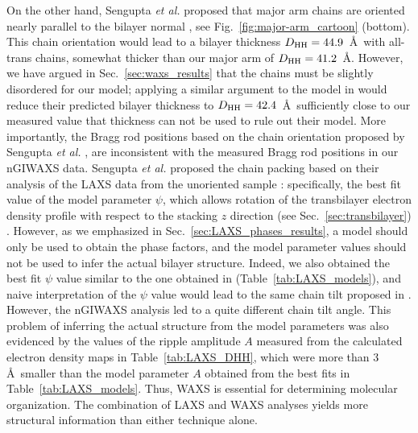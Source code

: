 On the other hand, 
Sengupta \textit{et al.} proposed that major arm chains are oriented
nearly parallel to the bilayer normal \cite{ref:Sengupta00,ref:Sengupta03},
see Fig.~\ref{fig:major-arm_cartoon} (bottom). 
This chain orientation would lead to a bilayer thickness $D_\textrm{HH}=44.9$~\AA\
with all-trans chains, somewhat thicker than our major arm of $D_\textrm{HH}=41.2$~\AA.  
However, we have argued in Sec.~\ref{sec:waxs_results} that the chains must be 
slightly disordered for our model; applying a similar argument to the
model in \cite{ref:Sengupta00,ref:Sengupta03} would reduce their predicted 
bilayer thickness to $D_\textrm{HH}=42.4$~\AA\, sufficiently close to our measured value 
that thickness can not be used to rule out their model.  
More importantly, the
Bragg rod positions based on the chain orientation proposed by 
Sengupta \textit{et al.} \cite{ref:Sengupta00,ref:Sengupta03}, 
are inconsistent with the measured Bragg rod positions in our nGIWAXS data.
Sengupta \textit{et al.} proposed the chain packing based on their analysis of the 
LAXS data from the unoriented sample \cite{ref:Wack89}:
specifically,  
the best fit value of the model parameter $\psi$,
which allows rotation of the transbilayer electron density profile with respect to 
the stacking $z$ direction (see Sec.~\ref{sec:transbilayer}) 
\cite{ref:Sengupta00,ref:Sengupta03}. 
However, as we emphasized in Sec.~\ref{sec:LAXS_phases_results},
a model should only be used to obtain the phase factors, and the model parameter
values should not be used to infer the actual bilayer structure.
Indeed, we also obtained the best fit $\psi$ value similar to the one obtained in 
\cite{ref:Sengupta00,ref:Sengupta03} (Table~\ref{tab:LAXS_models}), 
and naive interpretation of the $\psi$ value would
lead to the same chain tilt proposed in \cite{ref:Sengupta00,ref:Sengupta03}.
However, the nGIWAXS analysis led to a quite different chain tilt angle.
This problem of inferring the actual structure from the model parameters 
was also evidenced by the values of the ripple amplitude $A$ measured 
from the calculated
electron density maps in Table~\ref{tab:LAXS_DHH}, which were more than
3 \AA\ smaller than the model parameter $A$ obtained from the best fits
in Table~\ref{tab:LAXS_models}.
Thus, WAXS is essential for determining molecular organization.
The combination of LAXS and WAXS analyses yields more structural information 
than either technique alone.

